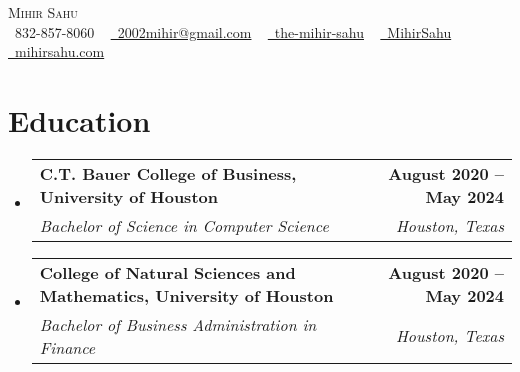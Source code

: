 \documentclass[letterpaper,11pt]{article}
\makeatletter
\newcommand{\resumeSubheading}[4]{
  \vspace{-2pt}\item
    \begin{tabular*}{1.0\textwidth}[t]{l@{\extracolsep{\fill}}r}
      \textbf{#1} & \textbf{\small #2} \\
      \textit{\small#3} & \textit{\small #4} \\
    \end{tabular*}\vspace{-7pt}
}
\newcommand{\resumeSubHeadingListStart}{\begin{itemize}[leftmargin=0.0in, label={}]}
\newcommand{\resumeSubHeadingListEnd}{\end{itemize}}
\makeatother
\begin{document}

\begin{center}
    {\Huge \scshape Mihir Sahu} \\ \vspace{1pt}
    \small \raisebox{-0.1\height}\faPhone\ 832-857-8060 ~ \href{mailto:2002mihir@gmail.com}{\raisebox{-0.2\height}\faEnvelope\  2002mihir@gmail.com} ~ 
    \href{https://linkedin.com/in/the-mihir-sahu}{\raisebox{-0.2\height}\faLinkedin\ the-mihir-sahu}  ~
    \href{https://github.com/MihirSahu}{\raisebox{-0.2\height}\faGithub\ MihirSahu} ~
    \href{https://mihirsahu.com}{\raisebox{-0.2\height}\faGlobeAmericas\ mihirsahu.com}
    \vspace{-8pt}
\end{center}


\section{Education}
  \resumeSubHeadingListStart
    \resumeSubheading
      { C.T. Bauer College of Business, University of Houston}{August 2020 -- May 2024}
      {Bachelor of Science in Computer Science}{Houston, Texas}
    \resumeSubheading
      {College of Natural Sciences and Mathematics, University of Houston}{August 2020 -- May 2024}
      {Bachelor of Business Administration in Finance}{Houston, Texas}
  \resumeSubHeadingListEnd
  
\end{document}
